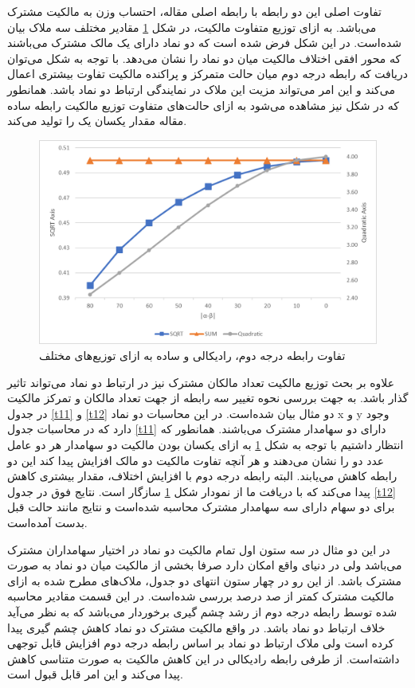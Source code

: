 \documentclass[12pt]{article}
\begin{document}
  تفاوت اصلی این دو رابطه با رابطه اصلی مقاله، احتساب وزن به  مالکیت مشترک می‌باشد.
  به ازای توزیع متفاوت مالکیت، در شکل 
  \ref{g4}
  مقادیر مختلف سه ملاک بیان شده‌است. در این شکل فرض شده است که دو نماد دارای یک مالک مشترک می‌باشند که محور افقی اختلاف مالکیت میان دو نماد را نشان می‌دهد. با توجه به شکل می‌توان دریافت  که رابطه درجه دوم میان حالت متمرکز و پراکنده مالکیت تفاوت بیشتری اعمال می‌کند و این امر می‌تواند مزیت این ملاک در نمایندگی ارتباط دو نماد باشد. همانطور که در شکل نیز مشاهده می‌شود به ازای حالت‌های متفاوت توزیع مالکیت رابطه ساده مقاله مقدار یکسان یک را تولید می‌کند.
  
    \begin{figure}[htbp]
    \centering
    \includegraphics[width=0.8\columnwidth]{1.png}
    \caption{
    تفاوت رابطه درجه دوم، رادیکالی و ساده به ازای توزیع‌های مختلف }
    \label{g4}
    \end{figure}
    
علاوه بر بحث توزیع مالکیت تعداد مالکان مشترک نیز در ارتباط دو نماد می‌تواند تاثیر گذار باشد. به جهت بررسی نحوه تغییر سه رابطه از جهت تعداد مالکان و تمرکز مالکیت در جدول 
\ref{t11}
و 
\ref{t12}
دو مثال بیان شده‌است. در این محاسبات دو نماد x
و
y 
وجود دارد که  در محاسبات جدول 
\ref{t11}
دارای دو سهامدار مشترک می‌باشند. همانطور که انتظار داشتیم با توجه به شکل 
\ref{g4}
به ازای یکسان بودن مالکیت دو سهامدار هر دو عامل عدد دو را نشان می‌دهند و هر آنچه تفاوت مالکیت دو مالک افزایش پیدا کند این دو رابطه کاهش می‌یابند. البته رابطه درجه دوم با افزایش اختلاف، مقدار بیشتری کاهش پیدا می‌کند که با دریافت ما از نمودار شکل 
\ref{g4}
سازگار است. نتایج فوق در جدول 
\ref{t12}
برای دو سهام دارای سه سهامدار مشترک محاسبه شده‌است و نتایج مانند حالت قبل بدست آمده‌است.

در این دو مثال در سه ستون اول تمام مالکیت دو نماد در اختیار سهامداران مشترک می‌باشد ولی در دنیای واقع امکان دارد صرفا بخشی از مالکیت میان دو نماد به صورت مشترک باشد. از این رو در چهار ستون انتهای دو جدول، ملاک‌های مطرح شده به ازای مالکیت‌ مشترک کمتر از صد درصد بررسی شده‌است. در این قسمت مقادیر محاسبه شده توسط رابطه درجه دوم از رشد چشم گیری برخوردار می‌باشد که به نظر می‌آید خلاف ارتباط دو نماد باشد. در واقع مالکیت مشترک دو نماد کاهش چشم گیری پیدا کرده است ولی ملاک ارتباط دو نماد بر اساس رابطه درجه دوم افزایش قابل توجهی داشته‌است. از طرفی رابطه رادیکالی در این کاهش مالکیت به صورت متناسی کاهش پیدا می‌کند و این امر قابل قبول است.
\end{document}
